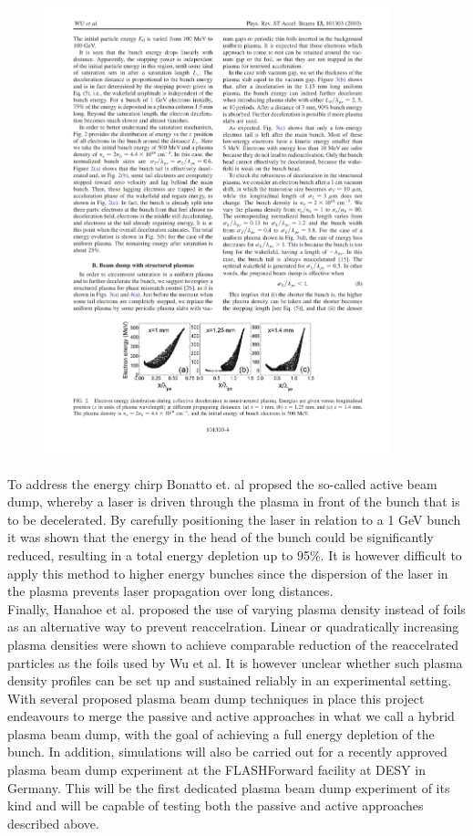 \begin{figure}
\centering
\includegraphics[width=0.9\textwidth]{Wu_energy_uniform.pdf}
\caption{}
\label{Wu}
\end{figure}
To address the energy chirp Bonatto et. al \cite{Bonatto2015} propsed the so-called active beam dump, whereby a laser is driven through the plasma in front of the bunch that is to be decelerated. By carefully positioning the laser in relation to a 1 GeV bunch it was shown that the energy in the head of the bunch could be significantly reduced, resulting in a total energy depletion up to 95\%. It is however difficult to apply this method to higher energy bunches since the dispersion of the laser in the plasma prevents laser propagation over long distances. \\
Finally, Hanahoe et al. \cite{Hanahoe2017} proposed the use of varying plasma density instead of foils as an alternative way to prevent reaccelration. Linear or quadratically increasing plasma densities were shown to achieve comparable reduction of the reaccelrated particles as the foils used by Wu et al.  It is however unclear whether such plasma density profiles can be set up and sustained reliably in an experimental setting. \\
With several proposed plasma beam dump techniques in place this project endeavours to merge the passive and active approaches in what we call a hybrid plasma beam dump, with the goal of achieving a full energy depletion of the bunch. In addition, simulations will also be carried out for a recently approved plasma beam dump experiment at the FLASHForward facility at DESY in Germany. This will be the first dedicated plasma beam dump experiment of its kind and will be capable of testing both the passive and active approaches described above. 
